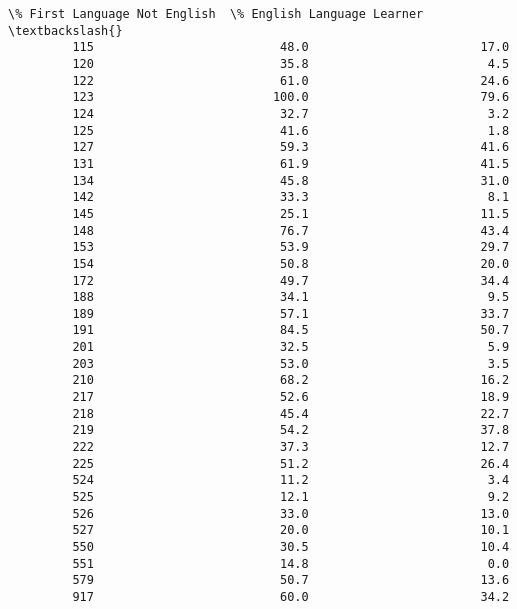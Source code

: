 \documentclass[11pt]{article}
\begin{document}
\begin{Verbatim}[commandchars=\\\{\}]
              \% First Language Not English  \% English Language Learner  \textbackslash{}
         115                          48.0                        17.0   
         120                          35.8                         4.5   
         122                          61.0                        24.6   
         123                         100.0                        79.6   
         124                          32.7                         3.2   
         125                          41.6                         1.8   
         127                          59.3                        41.6   
         131                          61.9                        41.5   
         134                          45.8                        31.0   
         142                          33.3                         8.1   
         145                          25.1                        11.5   
         148                          76.7                        43.4   
         153                          53.9                        29.7   
         154                          50.8                        20.0   
         172                          49.7                        34.4   
         188                          34.1                         9.5   
         189                          57.1                        33.7   
         191                          84.5                        50.7   
         201                          32.5                         5.9   
         203                          53.0                         3.5   
         210                          68.2                        16.2   
         217                          52.6                        18.9   
         218                          45.4                        22.7   
         219                          54.2                        37.8   
         222                          37.3                        12.7   
         225                          51.2                        26.4   
         524                          11.2                         3.4   
         525                          12.1                         9.2   
         526                          33.0                        13.0   
         527                          20.0                        10.1   
         550                          30.5                        10.4   
         551                          14.8                         0.0   
         579                          50.7                        13.6   
         917                          60.0                        34.2   
         

\end{Verbatim}
\end{document}
